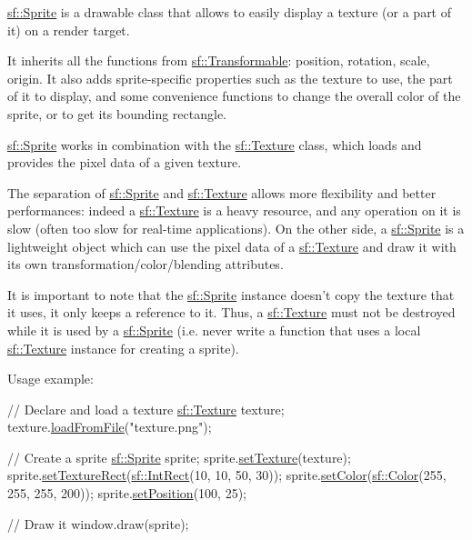 \hyperlink{classsf_1_1_sprite}{sf\+::\+Sprite} is a drawable class that allows to easily display a texture (or a part of it) on a render target.

It inherits all the functions from \hyperlink{classsf_1_1_transformable}{sf\+::\+Transformable}\+: position, rotation, scale, origin. It also adds sprite-\/specific properties such as the texture to use, the part of it to display, and some convenience functions to change the overall color of the sprite, or to get its bounding rectangle.

\hyperlink{classsf_1_1_sprite}{sf\+::\+Sprite} works in combination with the \hyperlink{classsf_1_1_texture}{sf\+::\+Texture} class, which loads and provides the pixel data of a given texture.

The separation of \hyperlink{classsf_1_1_sprite}{sf\+::\+Sprite} and \hyperlink{classsf_1_1_texture}{sf\+::\+Texture} allows more flexibility and better performances\+: indeed a \hyperlink{classsf_1_1_texture}{sf\+::\+Texture} is a heavy resource, and any operation on it is slow (often too slow for real-\/time applications). On the other side, a \hyperlink{classsf_1_1_sprite}{sf\+::\+Sprite} is a lightweight object which can use the pixel data of a \hyperlink{classsf_1_1_texture}{sf\+::\+Texture} and draw it with its own transformation/color/blending attributes.

It is important to note that the \hyperlink{classsf_1_1_sprite}{sf\+::\+Sprite} instance doesn't copy the texture that it uses, it only keeps a reference to it. Thus, a \hyperlink{classsf_1_1_texture}{sf\+::\+Texture} must not be destroyed while it is used by a \hyperlink{classsf_1_1_sprite}{sf\+::\+Sprite} (i.\+e. never write a function that uses a local \hyperlink{classsf_1_1_texture}{sf\+::\+Texture} instance for creating a sprite).

Usage example\+: 
\begin{DoxyCode}
\textcolor{comment}{// Declare and load a texture}
\hyperlink{classsf_1_1_texture}{sf::Texture} texture;
texture.\hyperlink{classsf_1_1_texture_a8e1b56eabfe33e2e0e1cb03712c7fcc7}{loadFromFile}(\textcolor{stringliteral}{"texture.png"});

\textcolor{comment}{// Create a sprite}
\hyperlink{classsf_1_1_sprite}{sf::Sprite} sprite;
sprite.\hyperlink{classsf_1_1_sprite_a3729c88d88ac38c19317c18e87242560}{setTexture}(texture);
sprite.\hyperlink{classsf_1_1_sprite_a3fefec419a4e6a90c0fd54c793d82ec2}{setTextureRect}(\hyperlink{classsf_1_1_rect}{sf::IntRect}(10, 10, 50, 30));
sprite.\hyperlink{classsf_1_1_sprite_a14def44da6437bfea20c4df5e71aba4c}{setColor}(\hyperlink{classsf_1_1_color}{sf::Color}(255, 255, 255, 200));
sprite.\hyperlink{classsf_1_1_transformable_a4dbfb1a7c80688b0b4c477d706550208}{setPosition}(100, 25);

\textcolor{comment}{// Draw it}
window.draw(sprite);
\end{DoxyCode}


